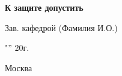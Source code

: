 \begin{titlepage}
\begin{onehalfspace}
\begin{mintemize}
\end{mintemize}
\noindent\textbf{К защите допустить}

Зав. кафедрой\textspaceend{/\hspace{2.5cm}}
{\center\vspace{-1.6em}\hspace{9cm}\tiny(Фамилия И.О.)}

"\textspaceend{\hspace{0.2cm}}”\textspaceend{\hspace{3cm}} 20\textspaceend{\hspace{0.2cm}}г.    

\vfill

\begin{center}
    Москва
\end{center}

\end{onehalfspace}

\end{titlepage}
